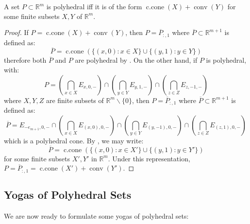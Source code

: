 \begin{prop}\label{prop:017-Minkowski-Weyl-Representation}
	A set $P\subset \mathbb{R}^m$ is polyhedral iff it is of the form $\operatorname{c.cone}(X)+\operatorname{conv}(Y)$ for some finite subsets $X,Y$ of $\mathbb{R}^m$.
\end{prop}
\begin{proof}
	If $P=\operatorname{c.cone}(X)+\operatorname{conv}(Y)$, then $P=\overline{P}_{:,1}$ where $\overline{P}\subset \mathbb{R}^{m+1}$ is defined as:
	\[
		\overline{P}=\operatorname{c.cone}\left(\{(x,0):x\in X\}\cup\{(y,1):y\in Y\}\right)
	\]
	therefore both $\overline{P}$ and $P$ are polyhedral by . On the other hand, if $P$ is polyhedral, with:
	\[
		P=\left(\bigcap_{x\in X} E_{x,0,-}\right)\cap\left(\bigcap_{y\in Y} E_{y,1,-}\right)\cap \left(\bigcap_{z\in Z} E_{z,-1,-}\right)
	\]
	where $X,Y,Z$ are finite subsets of $\mathbb{R}^m\smallsetminus\{0\}$, then $P=\overline{P}_{:,1}$ where $\overline{P}\subset \mathbb{R}^{m+1}$ is defined as:
	\[
		\overline{P}=E_{-e_{m+1},0,-}\cap\left(\bigcap_{x\in X} E_{(x,0),0,-}\right)\cap\left(\bigcap_{y\in Y} E_{(y,-1),0,-}\right)\cap \left(\bigcap_{z\in Z} E_{(z,1),0,-}\right)
	\]
	which is a polyhedral cone. By , we may write:
	\[
		\overline{P}=\operatorname{c.cone}\left(\{(x,0):x\in X'\}\cup \{(y, 1):y\in Y'\}\right)
	\]
	for some finite subsets $X',Y'$ in $\mathbb{R}^m$. Under this representation, $P=\overline{P}_{:,1}=\operatorname{c.cone}(X')+\operatorname{conv}(Y')$.
\end{proof}

\subsection{Yogas of Polyhedral Sets}

\paragraph{}We are now ready to formulate some yogas of polyhedral sets:

